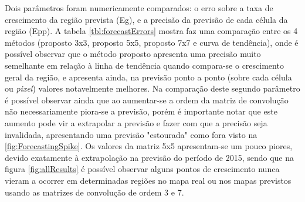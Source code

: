 Dois parâmetros foram numericamente comparados: o erro sobre a taxa de crescimento da região prevista (Eg), e a precisão da previsão de cada célula da região (Epp). A tabela \ref{tbl:forecastErrors} mostra faz uma comparação entre os 4 métodos (proposto 3x3, proposto 5x5, proposto 7x7 e curva de tendência), onde é possível observar que o método proposto apresenta uma precisão muito semelhante em relação à linha de tendência quando compara-se o crescimento geral da região, e apresenta ainda, na previsão ponto a ponto (sobre cada célula ou \emph{pixel}) valores notavelmente melhores. Na comparação deste segundo parâmetro é possível observar ainda que ao aumentar-se a ordem da matriz de convolução não necessariamente piora-se a previsão, porém é importante notar que este aumento pode vir a extrapolar a previsão e fazer com que a precisão seja invalidada, apresentando uma previsão "estourada" como fora visto na \ref{fig:ForecastingSpike}. Os valores da matriz 5x5 apresentam-se um pouco piores, devido exatamente à extrapolação na previsão do período de 2015, sendo que na figura \ref{fig:allResults} é possível observar alguns pontos de crescimento nunca vieram a ocorrer em determinadas regiões no mapa real ou nos mapas previstos usando as matrizes de convolução de ordem 3 e 7. 

